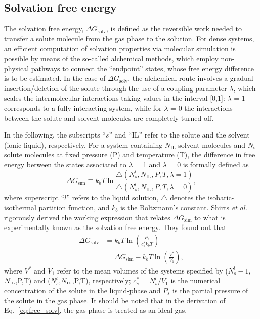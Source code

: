 \documentclass[3p,twocolumn]{elsarticle}
\begin{document}
\subsection*{Solvation free energy}
The solvation free energy, $\Delta G_{\text{solv}}$, is defined as the reversible work needed to transfer a solute molecule from the gas phase to the solution.
For dense systems, an efficient computation of solvation properties via molecular simulation is possible by means of the so-called alchemical methods, which employ non-physical pathways to connect the ``endpoint'' states, whose free energy difference is to be estimated.
In the case of $\Delta G_{\text{solv}}$, the alchemical route involves a gradual insertion/deletion of the solute through the use of a coupling parameter $\lambda$, which scales the intermolecular interactions taking values in the interval [0,1]: $\lambda$ = 1 corresponds to a fully interacting system, while for $\lambda$ = 0 the interactions between the solute and solvent molecules are completely turned-off.

In the following, the subscripts ``$s$'' and ``$\text{IL}$'' refer to the solute and the solvent (ionic liquid), respectively.
For a system containing $N_{\text{IL}}$ solvent molecules and $N_{\text{s}}$ solute molecules at fixed pressure (P) and temperature (T), the difference in free energy between the states associated to $\lambda$ = 1 and $\lambda$ = 0 is formally defined as
\begin{equation}
\Delta G_{\text{sim}} \equiv k_b T \ln \frac{\bigtriangleup (N_s^l,N_{\text{IL}},P,T,\lambda = 1)}{\bigtriangleup (N_s^l,N_{\text{IL}},P,T,\lambda = 0)}, 
\end{equation}
where superscript ``$l$'' refers to the liquid solution, $\bigtriangleup$ denotes the isobaric-isothermal partition function, and $k_b$ is the Boltzmann's constant.
Shirts \textit{et al.} \cite{Shirts_2003} rigorously derived the working expression that relates $\Delta G_{\text{sim}}$ to what is experimentally known as the solvation free energy.
They found out that
\begin{equation}
\begin{split}
\label{eq:free_solv}
 \Delta G_{\text{solv}}& =  k_b T \ln \left( \frac{P_s}{c_s^{\ast} k_b T} \right)\\ &= \Delta G_{\text{sim}} - k_bT \ln \left( \frac{V^{\ast}}{V_1} \right),
\end{split}
\end{equation}
where $V^{\ast}$ and $V_1$ refer to the mean volumes of the systems specified by ($N_s^l-1$,$N_\text{\tiny IL}$,P,T) and ($N_s^l$,$N_\text{\tiny IL}$,P,T), respectively; $c_s^{\ast}$ = $N_s^l/V_1$ is the numerical concentration of the solute in the liquid-phase and $P_s$ is the partial pressure of the solute in the gas phase.
It should be noted that in the derivation of Eq.~\eqref{eq:free_solv}, the gas phase is treated as an ideal gas. 
\end{document}
